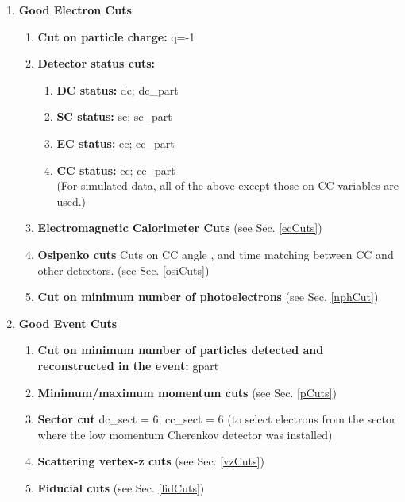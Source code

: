 \begin{enumerate}
\item {\bf Good Electron Cuts}
\begin{enumerate}
\item {\bf Cut on particle charge:}  q=-1
\item {\bf Detector status cuts:}  
\begin{enumerate}
\item {\bf DC status:}  dc; dc\_part
\item {\bf SC status:}  sc; sc\_part 
\item {\bf EC status:}  ec; ec\_part  
\item {\bf CC status:}  cc; cc\_part  \\
             (For simulated data, all of the above except those on CC variables are used.) %
\end{enumerate}
\item {\bf Electromagnetic Calorimeter Cuts}  (see Sec. \ref{ecCuts})
\item {\bf Osipenko cuts} Cuts on CC angle \th, \ph and time matching between CC and other detectors. (see Sec. \ref{osiCuts})
\item {\bf Cut on minimum number of photoelectrons}  (see Sec. \ref{nphCut})
\end{enumerate}
\item {\bf Good Event Cuts}
\begin{enumerate}
\item {\bf Cut on minimum number of particles detected and reconstructed in the event:} gpart 
\item {\bf Minimum/maximum momentum cuts} (see Sec. \ref{pCuts}) %
\item {\bf Sector cut}  dc\_sect = 6; cc\_sect = 6 (to select electrons from the sector where the low momentum Cherenkov detector was installed)
\item {\bf Scattering vertex-z cuts}  (see Sec. \ref{vzCuts})
\item {\bf Fiducial cuts}  (see Sec. \ref{fidCuts})
\end{enumerate}
\end{enumerate}

